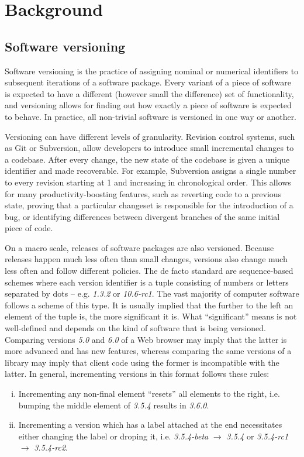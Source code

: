 \documentclass{l4proj}
\begin{document}
\section{Background}

\subsection{Software versioning}
Software versioning is the practice of assigning nominal or numerical
identifiers to subsequent iterations of a software package. Every
variant of a piece of software is expected to have a different
(however small the difference) set of functionality, and versioning
allows for finding out how exactly a piece of software is expected to
behave. In practice, all non-trivial software is versioned in one way
or another.

Versioning can have different levels of granularity. Revision control
systems, such as Git or Subversion, allow developers to introduce
small incremental changes to a codebase. After every change, the new
state of the codebase is given a unique identifier and made
recoverable. For example, Subversion assigns a single number to every
revision starting at 1 and increasing in chronological order. This
allows for many productivity-boosting features, such as reverting code
to a previous state, proving that a particular changeset is
responsible for the introduction of a bug, or identifying differences
between divergent branches of the same initial piece of code.

On a macro scale, releases of software packages are also versioned.
Because releases happen much less often than small changes, versions
also change much less often and follow different policies. The de
facto standard are sequence-based schemes where each version
identifier is a tuple consisting of numbers or letters separated by
dots -- e.g. \textit{1.3.2} or \textit{10.6-rc1}. The vast majority of
computer software follows a scheme of this type. It is usually implied
that the further to the left an element of the tuple is, the more
significant it is. What ``significant'' means is not well-defined and
depends on the kind of software that is being versioned. Comparing
versions \textit{5.0} and \textit{6.0} of a Web browser may imply that
the latter is more advanced and has new features, whereas comparing
the same versions of a library may imply that client code using the
former is incompatible with the latter. In general, incrementing
versions in this format follows these rules:
\begin{enumerate}[(i)]
\item Incrementing any non-final element ``resets'' all elements to
the right, i.e. bumping the middle element of \textit{3.5.4} results
in \textit{3.6.0}.
\item Incrementing a version which has a label attached at the end
necessitates either changing the label or droping it, i.e.
\textit{3.5.4-beta} $\rightarrow$ \textit{3.5.4} or \textit{3.5.4-rc1}
$\rightarrow $ \textit{3.5.4-rc2}.
\end{enumerate}
\end{document}
